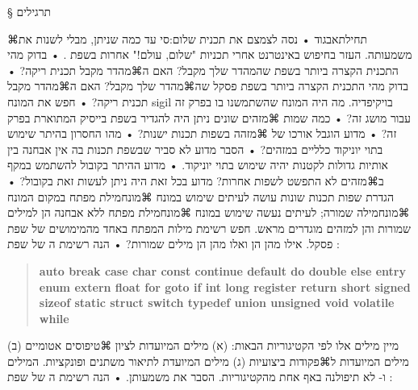 § תרגילים

⌘תחילת{אבגוד}
• נסה לצמצם את  תכנית שלום:סי עד כמה שניתן, מבלי לשנות את משמעותה. 
העזר בחיפוש באינטרנט אחרי תכניות "שלום, עולם!" אחרות בשפת .
• בדוק מהי התכנית הקצרה ביותר בשפת  שהמהדר שלך מקבל? האם ה⌘מהדר מקבל
תכנית ריקה?
• בדוק מהי התכנית הקצרה ביותר בשפת פסקל שה⌘מהדר שלך מקבל? האם ה⌘מהדר מקבל
תכנית ריקה?
• חפש את המונח sigil בויקיפדיה. מה היה המונח שהשתמשנו בו בפרק זה עבור מושג זה?
• כמה שמות ⌘מזהים שונים ניתן היה להגדיר בשפת בייסיק המתוארת בפרק זה?
• מדוע הוגבל אורכו של ⌘מזהה בשפות תכנות ישנות?
• מהו החסרון בהיתר שימוש בתוי יוניקוד כלליים במזהים?
• הסבר מדוע לא סביר שבשפת תכנות בה אין אבחנה בין אותיות גדולות לקטנות יהיה שימוש בתוי יוניקוד.
• מדוע ההיתר בקובול להשתמש במקף ב⌘מזהים לא התפשט לשפות אחרות? מדוע בכל זאת היה ניתן לעשות זאת בקובול?
• הגדרת שפות תכנות שונות עושה לעיתים שימוש במונח ⌘מונח{מילת מפתח} במקום 
המונח ⌘מונח{מילה שמורה}; לעיתים נעשה שימוש במונח ⌘מונח{מילת מפתח} ללא אבחנה
הן למילים שמורות והן למזהים מוגדרים מראש. חפש רשימת מילות המפתח באחד מהמימושים של שפת פסקל.
אילו מהן הן  ואלו מהן הן מילים שמורות?
• הנה רשימת ה של שפת :
\begin{quote}
\setLTR
\listingsfont\bfseries
auto break case char const continue default do double else entry enum
extern float for goto if int long register return short signed sizeof
static struct switch typedef union unsigned void volatile while
\end{quote}
מיין מילים אלו לפי הקטיגוריות הבאות: (א) מילים המיועדות לציון ⌘טיפוסים אטומיים (ב) מילים המיועדות ל⌘פקודות ביצועיות (ג) מילים המיועדת לתיאור משתנים ופונקציות. המילים  ו- לא תיפולנה באף אחת מהקטיגוריות. הסבר את משמעותן.
• הנה רשימת ה של שפת :

